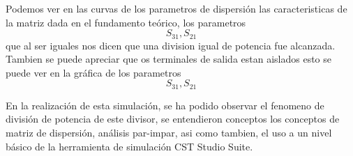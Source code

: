 \documentclass[a4paper]{IEEEtran} %
\begin{document}
Podemos ver en las curvas de los parametros de dispersión las caracteristicas de la matriz dada en el fundamento teórico, los parametros $$S_{31},S_{21}$$ que al ser iguales nos dicen que una division igual de potencia fue alcanzada.
Tambien se puede apreciar que os terminales de salida estan aislados esto se puede ver en la gráfica de los parametros $$S_{31},S_{21}$$ 

En la realización de esta simulación, se ha podido observar el fenomeno de división de potencia de este divisor, se entendieron conceptos los conceptos de matriz de dispersión, análisis par-impar, asi como tambien, el uso a un nivel básico de la herramienta de simulación CST Studio Suite.


\end{document}

